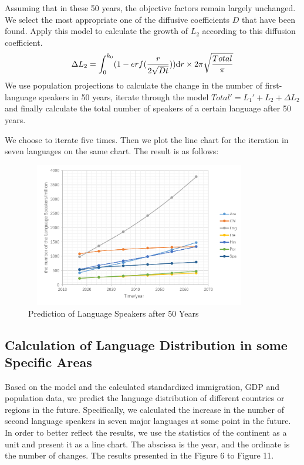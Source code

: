 \documentclass{mcmthesis}
\begin{document}
    Assuming that in these 50 years, the objective factors remain largely unchanged.
    We select the most appropriate one of the diffusive coefficients $D$ that have been found.
    Apply this model to calculate the growth of $L_2$ according to this diffusion coefficient.
    $$\Delta L_2=\int_0^{k_0}(1-erf(\frac{r}{2\sqrt{Dt}})){\rm d}r\times 2\pi\sqrt{\frac{Total}{\pi}}$$
    We use population projections to calculate the change in the number of first-language speakers in 50 years,
    iterate through the model $Total'=L_1'+L_2+\Delta L_2$ and finally calculate the total number of speakers of a certain language after 50 years.

    We choose to iterate five times.
    Then we plot the line chart for the iteration in seven languages on the same chart.
    The result is as follows:
    \begin{figure}[h]
      \centering
      \includegraphics[height=6.3cm,width=10cm]{p4.png}
      \caption{Prediction of Language Speakers after 50 Years}
      \label{p4}
    \end{figure}

    \subsection{Calculation of Language Distribution in some Specific Areas}
    Based on the model and the calculated standardized immigration, GDP and population data,
    we predict the language distribution of different countries or regions in the future.
    Specifically, we calculated the increase in the number of second language speakers in seven major languages at some point in the future.
    In order to better reflect the results, we use the statistics of the continent as a unit and present it as a line chart.
    The abscissa is the year, and the ordinate is the number of changes.
    The results presented in the Figure 6 to Figure 11.
\end{document}
